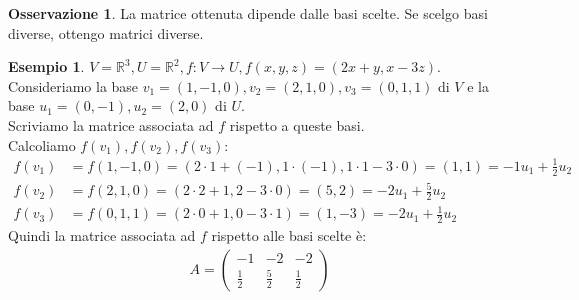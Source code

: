 \documentclass[a4paper]{article}
\theoremstyle{definition}
\newtheorem*{oss}{Osservazione}
\newtheorem*{es}{Esempio}
\begin{document}
\begin{oss}
	La matrice ottenuta dipende dalle basi scelte. Se scelgo basi diverse, ottengo matrici diverse.
\end{oss}

\begin{es}
	$V = \mathbb{R}^3, U = \mathbb{R}^2, f: V \rightarrow U, f(x, y, z) = (2x + y, x - 3z)$. \\
	Consideriamo la base $v_1 = (1, -1, 0), v_2 = (2, 1, 0), v_3 = (0, 1, 1)$ di $V$ e la base $u_1 = (0, -1), u_2 = (2, 0)$ di $U$. \\
	Scriviamo la matrice associata ad $f$ rispetto a queste basi. \\
	Calcoliamo $f(v_1), f(v_2), f(v_3)$:
	\begin{align*}
		f(v_1) & = f(1, -1, 0) = (2 \cdot 1 + (-1), 1 \cdot (-1), 1 \cdot 1 - 3 \cdot 0) = (1, 1) = - 1u_1 + \frac{1}{2}u_2 \\
		f(v_2) & = f(2, 1, 0) = (2 \cdot 2 + 1, 2 - 3 \cdot 0) = (5, 2) = - 2u_1 + \frac{5}{2}u_2 \\
		f(v_3) & = f(0, 1, 1) = (2 \cdot 0 + 1, 0 - 3 \cdot 1) = (1, -3) = - 2u_1 + \frac{1}{2}u_2
	\end{align*}
	Quindi la matrice associata ad $f$ rispetto alle basi scelte è:
	\begin{align*}
		A = \begin{pmatrix}
			    -1 & -2 & -2 \\
			    \frac{1}{2} & \frac{5}{2} & \frac{1}{2}
		    \end{pmatrix}
	\end{align*}
\end{es}
\end{document}
